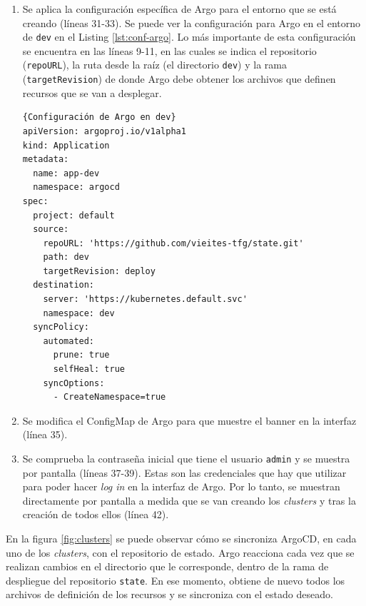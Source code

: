 \begin{enumerate}
    \begin{bclogo}[logo=\bcattention]{Important!}
      CITAR MANUAL DE USUARIO
    \end{bclogo}
  \item Se aplica la configuración específica de Argo para el entorno que se está creando (líneas 31-33). Se puede ver la configuración para Argo en el entorno de \texttt{dev} en el Listing \ref{lst:conf-argo}. Lo más importante de esta configuración se encuentra en las líneas 9-11, en las cuales se indica el repositorio (\texttt{repoURL}), la ruta desde la raíz (el directorio \texttt{dev}) y la rama (\texttt{targetRevision}) de donde Argo debe obtener los archivos que definen recursos que se van a desplegar.
\begin{lstlisting}[language=helm,label=lst:conf-argo]{Configuración de Argo en dev}
apiVersion: argoproj.io/v1alpha1
kind: Application
metadata:
  name: app-dev
  namespace: argocd
spec:
  project: default
  source:
    repoURL: 'https://github.com/vieites-tfg/state.git'
    path: dev
    targetRevision: deploy
  destination:
    server: 'https://kubernetes.default.svc'
    namespace: dev
  syncPolicy:
    automated:
      prune: true
      selfHeal: true
    syncOptions:
      - CreateNamespace=true
\end{lstlisting}
  \item Se modifica el ConfigMap de Argo para que muestre el banner en la interfaz (línea 35).
  \item Se comprueba la contraseña inicial que tiene el usuario \texttt{admin} y se muestra por pantalla (líneas 37-39). Estas son las credenciales que hay que utilizar para poder hacer \textit{log in} en la interfaz de Argo. Por lo tanto, se muestran directamente por pantalla a medida que se van creando los \textit{clusters} y tras la creación de todos ellos (línea 42).
\end{enumerate}

En la figura \ref{fig:clusters} se puede observar cómo se sincroniza ArgoCD, en cada uno de los \textit{clusters}, con el repositorio de estado. Argo reacciona cada vez que se realizan cambios en el directorio que le corresponde, dentro de la rama de despliegue del repositorio \texttt{state}. En ese momento, obtiene de nuevo todos los archivos de definición de los recursos y se sincroniza con el estado deseado.

